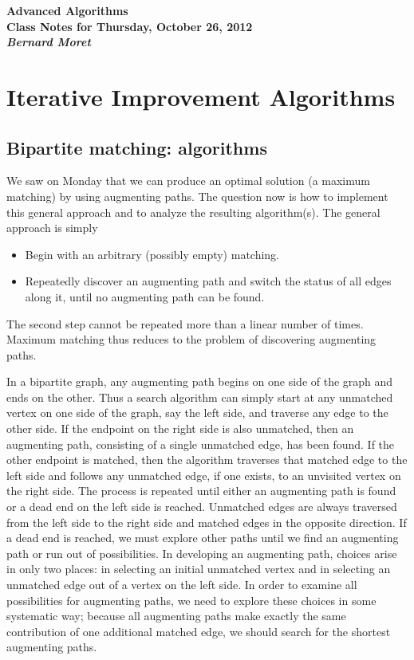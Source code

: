 \documentclass[11pt]{article}
\begin{document}
\begin{center}
  \LARGE\bf Advanced Algorithms\\

  \Large\sf
  Class Notes for Thursday, October 26, 2012\\

  \it
  Bernard Moret
\end{center}

\bigskip

\section{Iterative Improvement Algorithms}

\subsection{Bipartite matching: algorithms}
We saw on Monday that we can produce an optimal solution (a maximum
matching) by using augmenting paths.  The question now is how to
implement this general approach and to analyze the resulting algorithm(s).
The general approach is simply
\begin{itemize}
  \item
    Begin with an arbitrary (possibly empty) matching.
  \item
    Repeatedly discover an augmenting path and switch the status of all edges
    along it, until no augmenting path can be found.
\end{itemize}
The second step cannot be repeated more than a linear number of times.
Maximum matching thus reduces to the problem of discovering augmenting paths.

In a bipartite graph, any augmenting path begins on one side of the graph
and ends on the other.  Thus a search algorithm can simply start at any
unmatched vertex on one side of the graph, say the left side,
and traverse any edge to the other side.  If the endpoint on the right side
is also unmatched, then an augmenting path, consisting of a single
unmatched edge, has been found.  If the other endpoint is matched, then the
algorithm traverses that matched edge to the left side and follows
any unmatched edge, if one exists, to an unvisited vertex on the right side.
The process is repeated until either an augmenting path is
found or a dead end on the left side is reached.
Unmatched edges are always traversed from the left side to the right side and
matched edges in the opposite direction. 
If a dead end is reached, we must explore other paths until we find
an augmenting path or run out of possibilities.
In developing an augmenting path, choices arise in only two
places: in selecting an initial unmatched vertex
and in selecting an unmatched edge out of a vertex on the left side.
In order to examine all possibilities for augmenting paths, we need
to explore these choices in some systematic way; because all augmenting
paths make exactly the same contribution of one additional matched edge,
we should search for the shortest augmenting paths.
\end{document}
